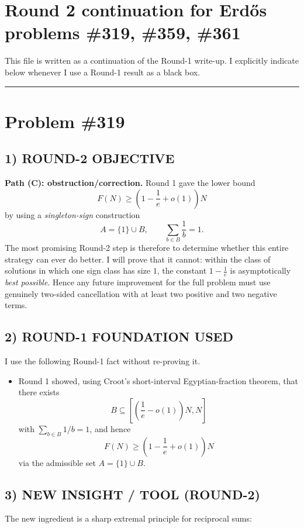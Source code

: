 
\section*{Round 2 continuation for Erd\H{o}s problems \#319, \#359, \#361}

This file is written as a continuation of the Round-1 write-up.  I explicitly indicate below whenever I use a Round-1 result as a black box.

\bigskip
\hrule
\bigskip

\section*{Problem \#319}

\subsection*{1) ROUND-2 OBJECTIVE}
\textbf{Path (C): obstruction/correction.}  Round 1 gave the lower bound
\[
F(N)\ge \left(1-\frac1e+o(1)\right)N
\]
by using a \emph{singleton-sign} construction
\[
A=\{1\}\cup B,\qquad \sum_{b\in B}\frac1b=1.
\]
The most promising Round-2 step is therefore to determine whether this entire strategy can ever do better.  I will prove that it cannot: within the class of solutions in which one sign class has size $1$, the constant $1-\frac1e$ is asymptotically \emph{best possible}.  Hence any future improvement for the full problem must use genuinely two-sided cancellation with at least two positive and two negative terms.

\subsection*{2) ROUND-1 FOUNDATION USED}
I use the following Round-1 fact without re-proving it.

\begin{itemize}
\item Round 1 showed, using Croot's short-interval Egyptian-fraction theorem, that there exists
\[
B\subseteq \left[\left(\frac1e-o(1)\right)N,N\right]
\]
with $\sum_{b\in B}1/b=1$, and hence
\[
F(N)\ge \left(1-\frac1e+o(1)\right)N
\]
via the admissible set $A=\{1\}\cup B$.
\end{itemize}

\subsection*{3) NEW INSIGHT / TOOL (ROUND-2)}
The new ingredient is a sharp extremal principle for reciprocal sums:

